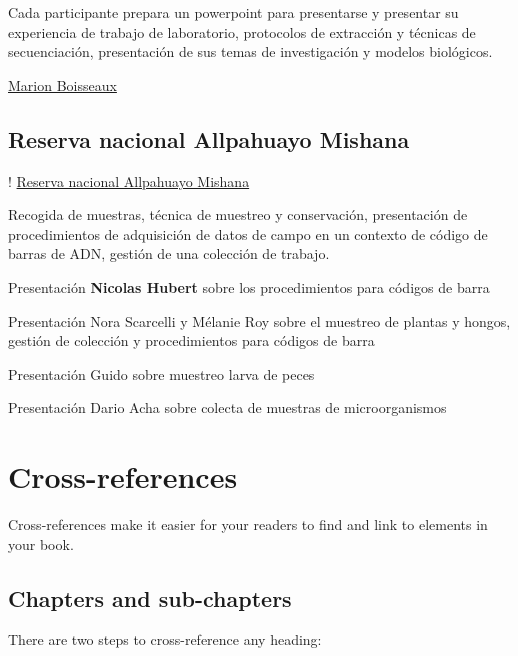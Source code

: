 \documentclass[
]{book}
\begin{document}
Cada participante prepara un powerpoint para presentarse y presentar su experiencia de trabajo de laboratorio, protocolos de extracción y técnicas de secuenciación, presentación de sus temas de investigación y
modelos biológicos.

\href{presentaciones_participantes/MBoisseaux.pdf}{Marion Boisseaux}

\hypertarget{reserva-nacional-allpahuayo-mishana}{%
\section{Reserva nacional Allpahuayo Mishana}\label{reserva-nacional-allpahuayo-mishana}}

! \href{photos/20240829_070712.jpg}{Reserva nacional Allpahuayo Mishana}

Recogida de muestras, técnica de muestreo y conservación, presentación de procedimientos de adquisición de datos de campo en un contexto de código de barras de ADN, gestión de una colección de trabajo.

Presentación \textbf{Nicolas Hubert} sobre los procedimientos para códigos de barra

Presentación Nora Scarcelli y Mélanie Roy sobre el muestreo de plantas y
hongos, gestión de colección y procedimientos para códigos de barra

Presentación Guido sobre muestreo larva de peces

Presentación Dario Acha sobre colecta de muestras de microorganismos

\hypertarget{cross}{%
\chapter{Cross-references}\label{cross}}

Cross-references make it easier for your readers to find and link to elements in your book.

\hypertarget{chapters-and-sub-chapters}{%
\section{Chapters and sub-chapters}\label{chapters-and-sub-chapters}}

There are two steps to cross-reference any heading:
\end{document}
